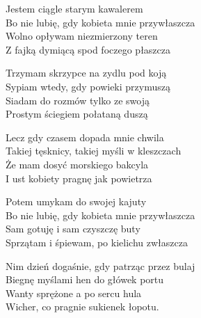 \begin{text}
    Jestem ciągle starym kawalerem\\
    Bo nie lubię, gdy kobieta mnie przywłaszcza\\
    Wolno opływam niezmierzony teren\\
    Z fajką dymiącą spod foczego płaszcza

    Trzymam skrzypce na zydlu pod koją\\
    Sypiam wtedy, gdy powieki przymuszą\\
    Siadam do rozmów tylko ze swoją\\
    Prostym ściegiem połataną duszą

    Lecz gdy czasem dopada mnie chwila\\
    Takiej tęsknicy, takiej myśli w kleszczach\\
    Że mam dosyć morskiego bakcyla\\
    I ust kobiety pragnę jak powietrza

    Potem umykam do swojej kajuty\\
    Bo nie lubię, gdy kobieta mnie przywłaszcza\\
    Sam gotuję i sam czyszczę buty\\
    Sprzątam i śpiewam, po kielichu zwłaszcza

    Nim dzień dogaśnie, gdy patrząc przez bulaj\\
    Biegnę myślami hen do główek portu\\
    Wanty sprężone a po sercu hula\\
    Wicher, co pragnie sukienek łopotu.
\end{text}
\begin{chord}

\end{chord}